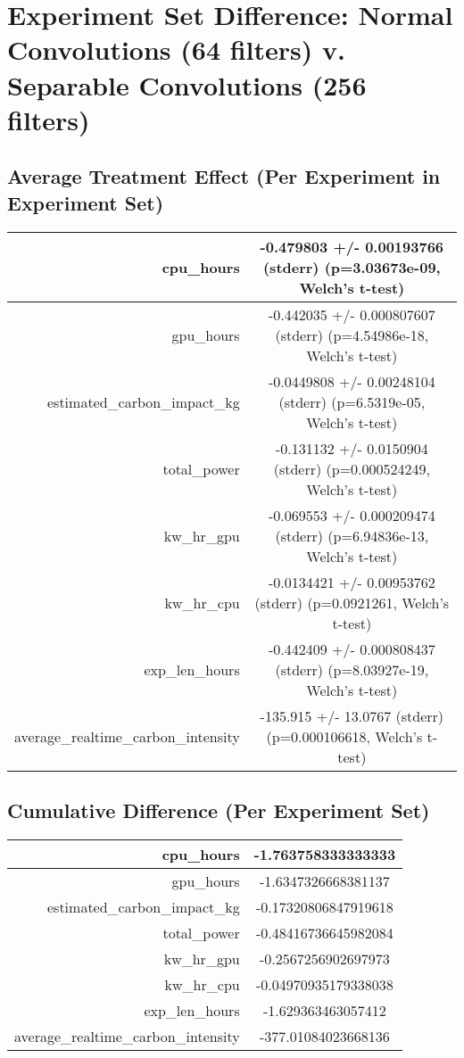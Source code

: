 \documentclass{article}%
\begin{document}
%
\normalsize%
\section{Experiment Set Difference: Normal Convolutions (64 filters) v. Separable Convolutions (256 filters)}%
\label{sec:Experiment Set Difference Normal Convolutions (64 filters) v. Separable Convolutions (256 filters)}%
\subsection{Average Treatment Effect (Per Experiment in Experiment Set)}%
\label{subsec:Average Treatment Effect (Per Experiment in Experiment Set)}%
\begin{tabular}{|r|c|}%
\hline%
cpu\_hours&{-}0.479803 +/{-} 0.00193766 (stderr) (p=3.03673e{-}09, Welch's t{-}test)\\%
\hline%
gpu\_hours&{-}0.442035 +/{-} 0.000807607 (stderr) (p=4.54986e{-}18, Welch's t{-}test)\\%
\hline%
estimated\_carbon\_impact\_kg&{-}0.0449808 +/{-} 0.00248104 (stderr) (p=6.5319e{-}05, Welch's t{-}test)\\%
\hline%
total\_power&{-}0.131132 +/{-} 0.0150904 (stderr) (p=0.000524249, Welch's t{-}test)\\%
\hline%
kw\_hr\_gpu&{-}0.069553 +/{-} 0.000209474 (stderr) (p=6.94836e{-}13, Welch's t{-}test)\\%
\hline%
kw\_hr\_cpu&{-}0.0134421 +/{-} 0.00953762 (stderr) (p=0.0921261, Welch's t{-}test)\\%
\hline%
exp\_len\_hours&{-}0.442409 +/{-} 0.000808437 (stderr) (p=8.03927e{-}19, Welch's t{-}test)\\%
\hline%
average\_realtime\_carbon\_intensity&{-}135.915 +/{-} 13.0767 (stderr) (p=0.000106618, Welch's t{-}test)\\%
\hline%
\end{tabular}

%
\subsection{Cumulative Difference (Per Experiment Set)}%
\label{subsec:Cumulative Difference (Per Experiment Set)}%
\begin{tabular}{|r|c|}%
\hline%
cpu\_hours&{-}1.763758333333333\\%
\hline%
gpu\_hours&{-}1.6347326668381137\\%
\hline%
estimated\_carbon\_impact\_kg&{-}0.17320806847919618\\%
\hline%
total\_power&{-}0.48416736645982084\\%
\hline%
kw\_hr\_gpu&{-}0.2567256902697973\\%
\hline%
kw\_hr\_cpu&{-}0.04970935179338038\\%
\hline%
exp\_len\_hours&{-}1.629363463057412\\%
\hline%
average\_realtime\_carbon\_intensity&{-}377.01084023668136\\%
\hline%
\end{tabular}

%
\end{document}
